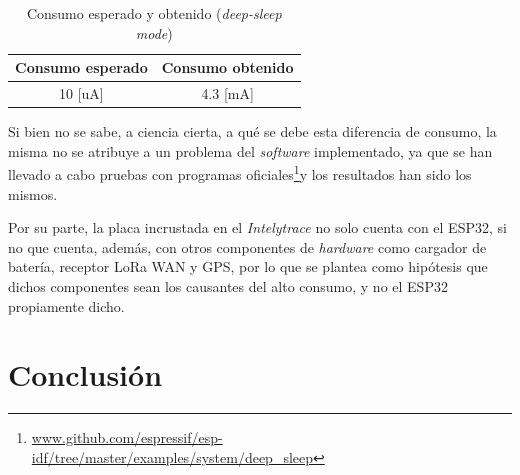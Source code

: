 \documentclass{article}
\newcommand{ \fnejemplos }{\footnote{\url{www.github.com/espressif/esp-idf/tree/master/examples/system/deep_sleep}}}
\begin{document}
    \begin{table}[h]
        \centering
        \begin{tabular}{||c|c||} 
            \hline
            Consumo esperado & Consumo obtenido \\ [0.5ex] 
            \hline\hline
            10 [uA] & 4.3 [mA] \\
            \hline
        \end{tabular}
        \caption{Consumo esperado y obtenido (\emph{deep-sleep mode})}
        \label{tab:consumo}
    \end{table}

    Si bien no se sabe, a ciencia cierta, a qué se debe esta diferencia de 
    consumo, la misma no se atribuye a un problema del \emph{software} 
    implementado, ya que se han llevado a cabo pruebas con programas 
    oficiales\fnejemplos y los resultados han sido los mismos. \par
    Por su parte, la placa incrustada en el \emph{Intelytrace} no solo cuenta 
    con el ESP32, si no que cuenta, además, con otros componentes de 
    \emph{hardware} como cargador de batería, receptor LoRa WAN y GPS, por lo 
    que se plantea como hipótesis que dichos componentes sean los causantes del 
    alto consumo, y no el ESP32 propiamente dicho.


    \newpage
    \section{Conclusión}
\end{document}
